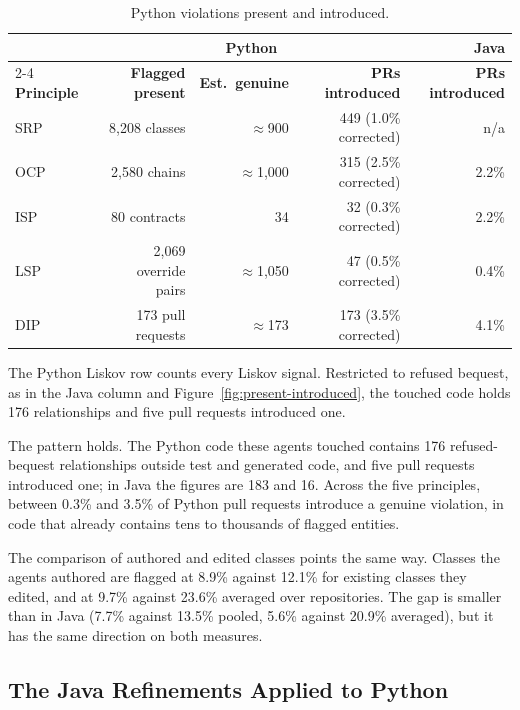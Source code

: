 \begin{table}[htb]
\centering
\caption{Python violations present and introduced.}
\label{tab:py-present-introduced}
\small
\begin{tabular}{@{}lrrrr@{}}
\toprule
 & \multicolumn{3}{c}{\textbf{Python}} & \textbf{Java} \\
\cmidrule(lr){2-4}
\textbf{Principle} & \textbf{Flagged present} & \textbf{Est.\ genuine} & \textbf{PRs introduced} &
\textbf{PRs introduced} \\
\midrule
SRP & 8{,}208 classes & $\approx$900 & 449 (1.0\% corrected) & n/a \\
OCP & 2{,}580 chains & $\approx$1{,}000 & 315 (2.5\% corrected) & 2.2\% \\
ISP & 80 contracts & 34 & 32 (0.3\% corrected) & 2.2\% \\
LSP & 2{,}069 override pairs & $\approx$1{,}050 & 47 (0.5\% corrected) & 0.4\% \\
DIP & 173 pull requests & $\approx$173 & 173 (3.5\% corrected) & 4.1\% \\
\bottomrule
\end{tabular}

\vspace{4pt}
\footnotesize The Python Liskov row counts every Liskov signal. Restricted to refused bequest, as in the
Java column and Figure~\ref{fig:present-introduced}, the touched code holds 176 relationships and five
pull requests introduced one.
\end{table}

The pattern holds. The Python code these agents touched contains 176 refused-bequest relationships
outside test and generated code, and five pull requests introduced one; in Java the figures are 183
and 16. Across the five principles, between 0.3\% and 3.5\% of Python pull requests introduce a
genuine violation, in code that already contains tens to thousands of flagged entities.

The comparison of authored and edited classes points the same way. Classes the agents authored are
flagged at 8.9\% against 12.1\% for existing classes they edited, and at 9.7\% against 23.6\% averaged
over repositories. The gap is smaller than in Java (7.7\% against 13.5\% pooled, 5.6\% against
20.9\% averaged), but it has the same direction on both measures.

\subsection{The Java Refinements Applied to Python}
\label{sec:python-refinements}

